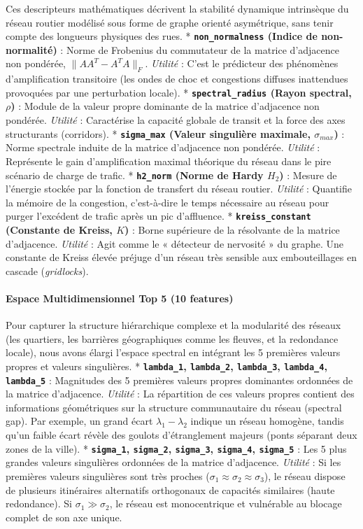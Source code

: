 \documentclass[11pt, a4paper]{article}
\begin{document}
Ces descripteurs mathématiques décrivent la stabilité dynamique
intrinsèque du réseau routier modélisé sous forme de graphe orienté
asymétrique, sans tenir compte des longueurs physiques des rues. *
\textbf{\texttt{non\_normalness} (Indice de non-normalité)} : Norme de
Frobenius du commutateur de la matrice d'adjacence non pondérée,
\(\|AA^T - A^TA\|_F\). \emph{Utilité} : C'est le prédicteur des
phénomènes d'amplification transitoire (les ondes de choc et congestions
diffuses inattendues provoquées par une perturbation locale). *
\textbf{\texttt{spectral\_radius} (Rayon spectral, \(\rho\))} : Module
de la valeur propre dominante de la matrice d'adjacence non pondérée.
\emph{Utilité} : Caractérise la capacité globale de transit et la force
des axes structurants (corridors). * \textbf{\texttt{sigma\_max} (Valeur
singulière maximale, \(\sigma_{max}\))} : Norme spectrale induite de la
matrice d'adjacence non pondérée. \emph{Utilité} : Représente le gain
d'amplification maximal théorique du réseau dans le pire scénario de
charge de trafic. * \textbf{\texttt{h2\_norm} (Norme de Hardy \(H_2\))}
: Mesure de l'énergie stockée par la fonction de transfert du réseau
routier. \emph{Utilité} : Quantifie la mémoire de la congestion,
c'est-à-dire le temps nécessaire au réseau pour purger l'excédent de
trafic après un pic d'affluence. * \textbf{\texttt{kreiss\_constant}
(Constante de Kreiss, \(K\))} : Borne supérieure de la résolvante de la
matrice d'adjacence. \emph{Utilité} : Agit comme le « détecteur de
nervosité » du graphe. Une constante de Kreiss élevée préjuge d'un
réseau très sensible aux embouteillages en cascade (\emph{gridlocks}).

\paragraph{Espace Multidimensionnel Top 5 (10
features)}\label{espace-multidimensionnel-top-5-10-features}

Pour capturer la structure hiérarchique complexe et la modularité des
réseaux (les quartiers, les barrières géographiques comme les fleuves,
et la redondance locale), nous avons élargi l'espace spectral en
intégrant les 5 premières valeurs propres et valeurs singulières. *
\textbf{\texttt{lambda\_1}, \texttt{lambda\_2}, \texttt{lambda\_3},
\texttt{lambda\_4}, \texttt{lambda\_5}} : Magnitudes des 5 premières
valeurs propres dominantes ordonnées de la matrice d'adjacence.
\emph{Utilité} : La répartition de ces valeurs propres contient des
informations géométriques sur la structure communautaire du réseau
(spectral gap). Par exemple, un grand écart \(\lambda_1 - \lambda_2\)
indique un réseau homogène, tandis qu'un faible écart révèle des goulots
d'étranglement majeurs (ponts séparant deux zones de la ville). *
\textbf{\texttt{sigma\_1}, \texttt{sigma\_2}, \texttt{sigma\_3},
\texttt{sigma\_4}, \texttt{sigma\_5}} : Les 5 plus grandes valeurs
singulières ordonnées de la matrice d'adjacence. \emph{Utilité} : Si les
premières valeurs singulières sont très proches
(\(\sigma_1 \approx \sigma_2 \approx \sigma_3\)), le réseau dispose de
plusieurs itinéraires alternatifs orthogonaux de capacités similaires
(haute redondance). Si \(\sigma_1 \gg \sigma_2\), le réseau est
monocentrique et vulnérable au blocage complet de son axe unique.
\end{document}
